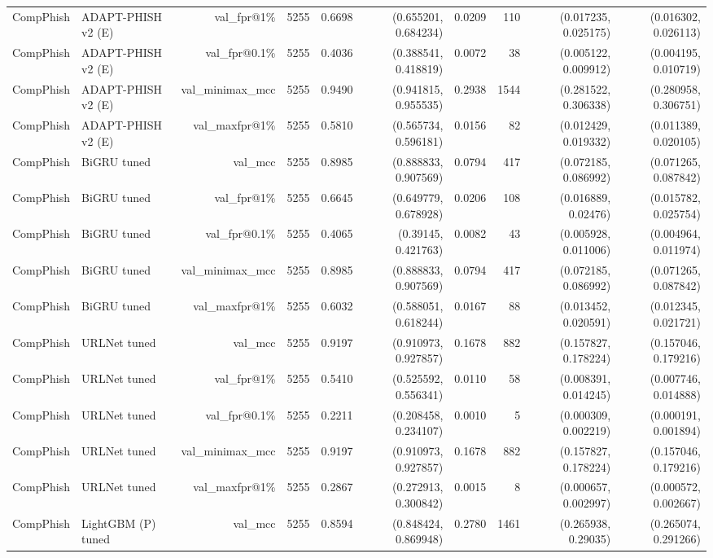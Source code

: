\begin{table}[t]
\begin{tabular}{llrrrrrrrr}
CompPhish & ADAPT-PHISH v2 (E) & val\_fpr@1\% & 5255 & 0.6698 & (0.655201, 0.684234) & 0.0209 & 110 & (0.017235, 0.025175) & (0.016302, 0.026113) \\
CompPhish & ADAPT-PHISH v2 (E) & val\_fpr@0.1\% & 5255 & 0.4036 & (0.388541, 0.418819) & 0.0072 & 38 & (0.005122, 0.009912) & (0.004195, 0.010719) \\
CompPhish & ADAPT-PHISH v2 (E) & val\_minimax\_mcc & 5255 & 0.9490 & (0.941815, 0.955535) & 0.2938 & 1544 & (0.281522, 0.306338) & (0.280958, 0.306751) \\
CompPhish & ADAPT-PHISH v2 (E) & val\_maxfpr@1\% & 5255 & 0.5810 & (0.565734, 0.596181) & 0.0156 & 82 & (0.012429, 0.019332) & (0.011389, 0.020105) \\
CompPhish & BiGRU tuned & val\_mcc & 5255 & 0.8985 & (0.888833, 0.907569) & 0.0794 & 417 & (0.072185, 0.086992) & (0.071265, 0.087842) \\
CompPhish & BiGRU tuned & val\_fpr@1\% & 5255 & 0.6645 & (0.649779, 0.678928) & 0.0206 & 108 & (0.016889, 0.02476) & (0.015782, 0.025754) \\
CompPhish & BiGRU tuned & val\_fpr@0.1\% & 5255 & 0.4065 & (0.39145, 0.421763) & 0.0082 & 43 & (0.005928, 0.011006) & (0.004964, 0.011974) \\
CompPhish & BiGRU tuned & val\_minimax\_mcc & 5255 & 0.8985 & (0.888833, 0.907569) & 0.0794 & 417 & (0.072185, 0.086992) & (0.071265, 0.087842) \\
CompPhish & BiGRU tuned & val\_maxfpr@1\% & 5255 & 0.6032 & (0.588051, 0.618244) & 0.0167 & 88 & (0.013452, 0.020591) & (0.012345, 0.021721) \\
CompPhish & URLNet tuned & val\_mcc & 5255 & 0.9197 & (0.910973, 0.927857) & 0.1678 & 882 & (0.157827, 0.178224) & (0.157046, 0.179216) \\
CompPhish & URLNet tuned & val\_fpr@1\% & 5255 & 0.5410 & (0.525592, 0.556341) & 0.0110 & 58 & (0.008391, 0.014245) & (0.007746, 0.014888) \\
CompPhish & URLNet tuned & val\_fpr@0.1\% & 5255 & 0.2211 & (0.208458, 0.234107) & 0.0010 & 5 & (0.000309, 0.002219) & (0.000191, 0.001894) \\
CompPhish & URLNet tuned & val\_minimax\_mcc & 5255 & 0.9197 & (0.910973, 0.927857) & 0.1678 & 882 & (0.157827, 0.178224) & (0.157046, 0.179216) \\
CompPhish & URLNet tuned & val\_maxfpr@1\% & 5255 & 0.2867 & (0.272913, 0.300842) & 0.0015 & 8 & (0.000657, 0.002997) & (0.000572, 0.002667) \\
CompPhish & LightGBM (P) tuned & val\_mcc & 5255 & 0.8594 & (0.848424, 0.869948) & 0.2780 & 1461 & (0.265938, 0.29035) & (0.265074, 0.291266) \\

\end{tabular}
\end{table}
